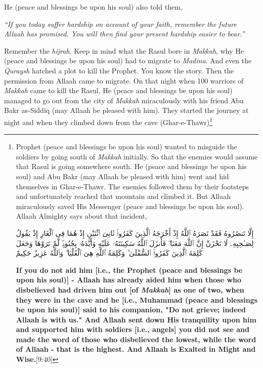 {He (peace and blessings be upon his soul) also told them, 
\begin{center}
    \textit{“If you today suffer hardship on account of your faith, remember the future Allaah has promised. You will then find your present hardship easier to bear.”
    }
\end{center}
\par Remember the \textit{hijrah}. Keep in mind what the Rasul bore in \textit{Makkah}, why He (peace and blessings be upon his soul)  had to migrate to \textit{Madina}. And even the \textit{Quraysh} hatched a plot to kill the Prophet. You know the story. Then the permission from Allaah came to migrate. On that night when 100 warriors of \textit{Makkah} came to kill the Rasul, He (peace and blessings be upon his soul) managed to go out from the city of \textit{Makkah} miraculously with his friend Abu Bakr as-Siddiq (may Allaah be pleased with him). They started the journey at night and when they climbed down from the cave (Ghar-e-Thawr)\footnote{Prophet (peace and blessings be upon his soul) wanted to misguide the soldiers by going south of \textit{Makkah} initially. So that the enemies would assume that Rasul is going somewhere south. He (peace and blessings be upon his soul) and Abu Bakr (may Allaah be pleased with him) went and hid themselves in Ghar-e-Thawr. The enemies followed them by their footsteps and unfortunately reached that mountain and climbed it. But Allaah miraculously saved His Messenger (peace and blessings be upon his soul). Allaah Almighty says about that incident,
\begin{center}
\begin{RLtext}
    	إِلَّا تَنصُرُوهُ فَقَدْ نَصَرَهُ ٱللَّهُ إِذْ أَخْرَجَهُ ٱلَّذِينَ كَفَرُوا۟ ثَانِىَ ٱثْنَيْنِ إِذْ هُمَا فِى ٱلْغَارِ إِذْ يَقُولُ لِصَـٰحِبِهِۦ لَا تَحْزَنْ إِنَّ ٱللَّهَ مَعَنَا ۖ فَأَنزَلَ ٱللَّهُ سَكِينَتَهُۥ عَلَيْهِ وَأَيَّدَهُۥ بِجُنُودٍۢ لَّمْ تَرَوْهَا وَجَعَلَ كَلِمَةَ ٱلَّذِينَ كَفَرُوا۟ ٱلسُّفْلَىٰ ۗ وَكَلِمَةُ ٱللَّهِ هِىَ ٱلْعُلْيَا ۗ وَٱللَّهُ عَزِيزٌ حَكِيمٌ 
\end{RLtext}    
\end{center}
\textbf{If you do not aid him [i.e., the Prophet (peace and blessings be upon his soul)] - Allaah has already aided him when those who disbelieved had driven him out [of \textit{Makkah}] as one of two, when they were in the cave and he [i.e., Muhammad (peace and blessings be upon his soul)] said to his companion, "Do not grieve; indeed Allaah is with us." And Allaah sent down His tranquility upon him and supported him with soldiers [i.e., angels] you did not see and made the word of those who disbelieved the lowest, while the word of Allaah - that is the highest. And Allaah is Exalted in Might and Wise.}[9:40]
}}
